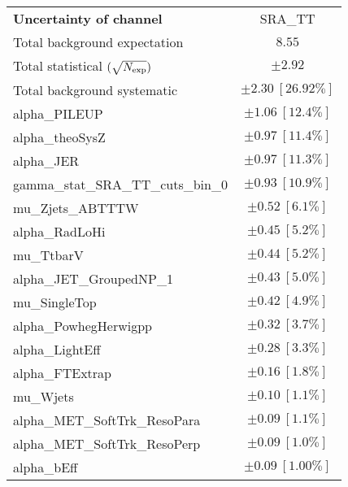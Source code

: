 
\begin{table}
\begin{center}
\setlength{\tabcolsep}{0.0pc}
\begin{tabular*}{\textwidth}{@{\extracolsep{\fill}}lc}
\noalign{\smallskip}\hline\noalign{\smallskip}
{\bf Uncertainty of channel}                                    & SRA\_TT            \\
\noalign{\smallskip}\hline\noalign{\smallskip}
Total background expectation             &  $8.55$       \\
\noalign{\smallskip}\hline\noalign{\smallskip}
Total statistical $(\sqrt{N_{\rm exp}})$              & $\pm 2.92$       \\
Total background systematic               & $\pm 2.30\ [26.92\%] $             \\
\noalign{\smallskip}\hline\noalign{\smallskip}
\noalign{\smallskip}\hline\noalign{\smallskip}
alpha\_PILEUP         & $\pm 1.06\ [12.4\%] $       \\
alpha\_theoSysZ         & $\pm 0.97\ [11.4\%] $       \\
alpha\_JER         & $\pm 0.97\ [11.3\%] $       \\
gamma\_stat\_SRA\_TT\_cuts\_bin\_0         & $\pm 0.93\ [10.9\%] $       \\
mu\_Zjets\_ABTTTW         & $\pm 0.52\ [6.1\%] $       \\
alpha\_RadLoHi         & $\pm 0.45\ [5.2\%] $       \\
mu\_TtbarV         & $\pm 0.44\ [5.2\%] $       \\
alpha\_JET\_GroupedNP\_1         & $\pm 0.43\ [5.0\%] $       \\
mu\_SingleTop         & $\pm 0.42\ [4.9\%] $       \\
alpha\_PowhegHerwigpp         & $\pm 0.32\ [3.7\%] $       \\
alpha\_LightEff         & $\pm 0.28\ [3.3\%] $       \\
alpha\_FTExtrap         & $\pm 0.16\ [1.8\%] $       \\
mu\_Wjets         & $\pm 0.10\ [1.1\%] $       \\
alpha\_MET\_SoftTrk\_ResoPara         & $\pm 0.09\ [1.1\%] $       \\
alpha\_MET\_SoftTrk\_ResoPerp         & $\pm 0.09\ [1.0\%] $       \\
alpha\_bEff         & $\pm 0.09\ [1.00\%] $       \\

\end{tabular*}
\end{center}
\end{table}
